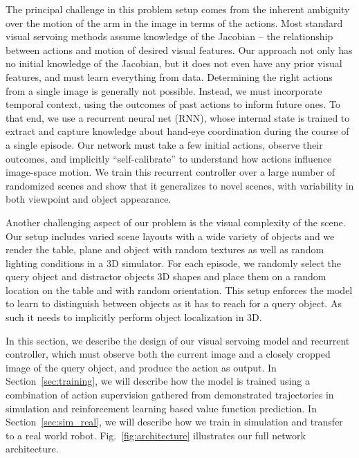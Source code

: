 \documentclass[10pt,twocolumn,letterpaper]{article}
\begin{document}
The principal challenge in this problem setup comes from the inherent ambiguity over the motion of the arm in the image in terms of the actions. Most standard visual servoing methods assume knowledge of the Jacobian -- the relationship between actions and motion of desired visual features. Our approach not only has no initial knowledge of the Jacobian, but it does not even have any prior visual features, and must learn everything from data. Determining the right actions from a single image is generally not possible. Instead, we must incorporate temporal context, using the outcomes of past actions to inform future ones. To that end, we use a recurrent neural net (RNN), whose internal state is trained to extract and capture knowledge about hand-eye coordination during the course of a single episode. Our network must take a few initial actions, observe their outcomes, and implicitly ``self-calibrate'' to understand how actions influence image-space motion.  We train this recurrent controller over a large number of randomized scenes and show that it generalizes to novel scenes, with variability in both viewpoint and object appearance.

Another challenging aspect of our problem is the visual complexity of the scene. Our setup includes varied scene layouts with a wide variety of objects and we render the table, plane and object with random textures as well as random lighting conditions in a 3D simulator. For each episode, we randomly select the query object and distractor objects 3D shapes and place them on a random location on the table and with random orientation. This setup enforces the model to learn to distinguish between objects as it has to reach for a query object. As such it needs to implicitly perform object localization in 3D. 

In this section, we describe the design of our visual servoing model and recurrent controller, which must observe both the current image and a closely cropped image of the query object, and produce the action as output. In Section~\ref{sec:training}, we will describe how the model is trained using a combination of action supervision gathered from demonstrated trajectories in simulation and reinforcement learning based value function prediction. In Section~\ref{sec:sim_real}, we will describe how we train in simulation and transfer to a real world robot. Fig.~\ref{fig:architecture} illustrates our full network architecture.
\end{document}
